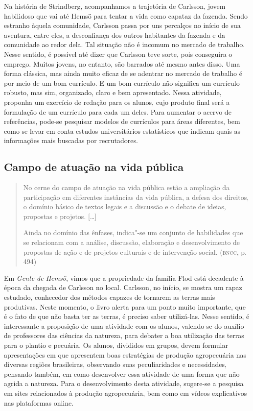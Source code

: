 \documentclass[12pt]{extarticle}
\begin{document}
Na história de Strindberg, acompanhamos a trajetória de Carlsson,
jovem habilidoso que vai até Hemsö para tentar a vida como capataz da
fazenda. Sendo estranho àquela comunidade, Carlsson passa por uns
percalços no início de sua aventura, entre eles, a desconfiança dos
outros habitantes da fazenda e da comunidade ao redor dela. Tal
situação não é incomum no mercado de trabalho. Nesse sentido, é
possível até dizer que Carlsson teve sorte, pois conseguira o emprego.
Muitos jovens, no entanto, são barrados até mesmo antes disso. Uma
forma clássica, mas ainda muito eficaz de se adentrar no mercado de
trabalho é por meio de um bom currículo. E um bom currículo não
significa um currículo robusto, mas sim, organizado, claro e bem
apresentado. Nessa atividade, proponha um exercício de redação para os
alunos, cujo produto final será a formulação de um currículo para cada
um deles. Para aumentar o acervo de referências, pode-se pesquisar
modelos de currículos para áreas diferentes, bem como se levar em
conta estudos universitários estatísticos que indicam quais as
informações mais buscadas por recrutadores.

\subsection{Campo de atuação na vida pública}

\begin{quote}
No cerne do campo de atuação na vida pública estão a ampliação da
participação em diferentes instâncias da vida pública, a defesa dos
direitos, o domínio básico de textos legais e a discussão e o debate de
ideias, propostas e projetos. {[}\ldots{}{]}

Ainda no domínio das ênfases, indica"-se um conjunto de habilidades que
se relacionam com a análise, discussão, elaboração e desenvolvimento de
propostas de ação e de projetos culturais e de intervenção social.
(\textsc{bncc}, p. 494)
\end{quote}

Em \emph{Gente de Hemsö}, vimos que a propriedade da família Flod está
decadente à época da chegada de Carlsson no local. Carlsson, no
início, se mostra um rapaz estudado, conhecedor dos métodos capazes de
tornarem as terras mais produtivas. Neste momento, o livro alerta para
um ponto muito importante, que é o fato de que não basta ter as
terras, é preciso saber utilizá-las. Nesse sentido, é interessante a
proposição de uma atividade com os alunos, valendo-se do auxílio de
professores das ciências da natureza, para debater a boa utilização
das terras para o plantio e pecuária. Os alunos, divididos em grupos,
devem formular apresentações em que apresentem boas estratégias de
produção agropecuária nas diversas regiões brasileiras, observando
suas peculiaridades e necessidades, pensando também, em como
desenvolver essa atividade de uma forma que não agrida a natureza.
Para o desenvolvimento desta atividade, sugere-se a pesquisa em sites
relacionados à produção agropecuária, bem como em vídeos explicativos
nas plataformas online.
\end{document}
